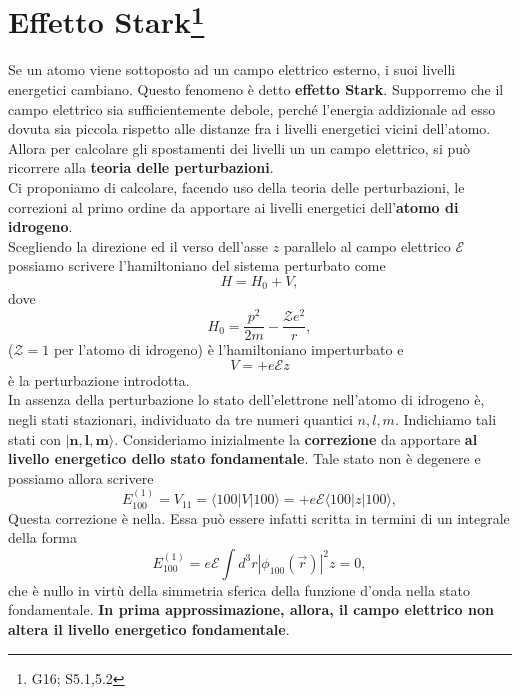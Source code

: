 \chapter[Effetto Stark]{Effetto Stark\footnote{G16; S5.1,5.2}}
Se un atomo viene sottoposto ad un campo elettrico esterno, i suoi livelli energetici cambiano. Questo fenomeno è detto \textbf{effetto Stark}.
Supporremo che il campo elettrico sia sufficientemente debole, perché l'energia addizionale ad esso dovuta sia piccola rispetto alle distanze fra i livelli energetici vicini dell'atomo. Allora per calcolare gli spostamenti dei livelli un un campo elettrico, si può ricorrere alla \textbf{teoria delle perturbazioni}.\\
Ci proponiamo di calcolare, facendo uso della teoria delle perturbazioni, le correzioni al primo ordine da apportare ai livelli energetici dell'\textbf{atomo di idrogeno}.\\
Scegliendo la direzione ed il verso dell'asse $z$ parallelo al campo elettrico $\mathcal{E}$ possiamo scrivere l'hamiltoniano del sistema perturbato come
\begin{equation}
H=H_0+V, 
\end{equation}
dove
\begin{equation}
H_0=\frac{p^2}{2m}-\frac{\mathcal{Z}e^2}{r},
\end{equation}
($\mathcal{Z}=1$ per l'atomo di idrogeno) è l'hamiltoniano imperturbato e
\begin{equation}
V=+e\mathcal{E}z
\end{equation}
è la perturbazione introdotta.\\
In assenza della perturbazione lo stato dell'elettrone nell'atomo di idrogeno è, negli stati stazionari, individuato da tre numeri quantici $n,l,m$. Indichiamo tali stati con $\boldsymbol{|n,l,m\rangle}$.
Consideriamo inizialmente la \textbf{correzione} da apportare \textbf{al livello energetico dello stato fondamentale}. Tale stato non è degenere e possiamo allora scrivere
\begin{equation}
E^{(1)}_{100}=V_{11}=\langle100| V |100\rangle =+e\mathcal{E}\langle 100 | z |100 \rangle,
\end{equation}
Questa correzione è nella. Essa può essere infatti scritta in termini di un integrale della forma
\begin{equation}
E^{(1)}_{100}=e\mathcal{E} \int d^3r \left|\phi_{100}(\vec{r})\right|^2 z=0,
\end{equation}
che è nullo in virtù della simmetria sferica della funzione d'onda nella stato fondamentale. \textbf{In prima approssimazione, allora, il campo elettrico non altera il livello energetico fondamentale}.\\
